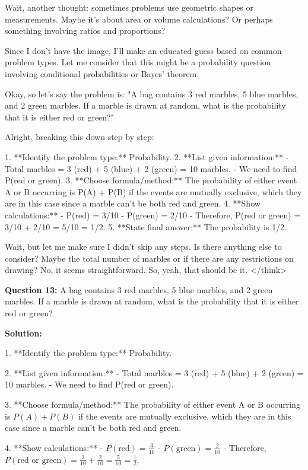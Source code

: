 \documentclass[12pt]{article}
\begin{document}
Wait, another thought: sometimes problems use geometric shapes or measurements. Maybe it's about area or volume calculations? Or perhaps something involving ratios and proportions?

Since I don't have the image, I'll make an educated guess based on common problem types. Let me consider that this might be a probability question involving conditional probabilities or Bayes' theorem.

Okay, so let's say the problem is: "A bag contains 3 red marbles, 5 blue marbles, and 2 green marbles. If a marble is drawn at random, what is the probability that it is either red or green?"

Alright, breaking this down step by step:

1. **Identify the problem type:** Probability.
2. **List given information:**
   - Total marbles = 3 (red) + 5 (blue) + 2 (green) = 10 marbles.
   - We need to find P(red or green).
3. **Choose formula/method:** The probability of either event A or B occurring is P(A) + P(B) if the events are mutually exclusive, which they are in this case since a marble can't be both red and green.
4. **Show calculations:**
   - P(red) = 3/10
   - P(green) = 2/10
   - Therefore, P(red or green) = 3/10 + 2/10 = 5/10 = 1/2.
5. **State final answer:** The probability is 1/2.

Wait, but let me make sure I didn't skip any steps. Is there anything else to consider? Maybe the total number of marbles or if there are any restrictions on drawing? No, it seems straightforward. So, yeah, that should be it.
</think>

\textbf{Question 13:}  
A bag contains 3 red marbles, 5 blue marbles, and 2 green marbles. If a marble is drawn at random, what is the probability that it is either red or green?

\textbf{Solution:}

1. **Identify the problem type:** Probability.

2. **List given information:**
   - Total marbles = 3 (red) + 5 (blue) + 2 (green) = 10 marbles.
   - We need to find P(red or green).

3. **Choose formula/method:**  
   The probability of either event A or B occurring is \( P(A) + P(B) \) if the events are mutually exclusive, which they are in this case since a marble can't be both red and green.

4. **Show calculations:**
   - \( P(\text{red}) = \frac{3}{10} \)
   - \( P(\text{green}) = \frac{2}{10} \)
   - Therefore, \( P(\text{red or green}) = \frac{3}{10} + \frac{2}{10} = \frac{5}{10} = \frac{1}{2} \).
\end{document}
